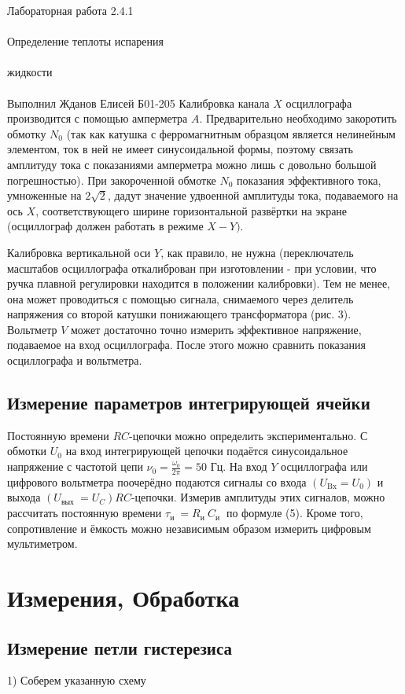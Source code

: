 \documentclass{astroedu-lab}
\begin{document}
\begin{problem}{\huge Лабораторная работа 2.4.1\\\\Определение теплоты испарения\\\\жидкости\\\\Выполнил Жданов Елисей Б01-205}
Калибровка канала $X$ осциллографа производится с помощью амперметра $A$. Предварительно необходимо закоротить обмотку $N_0$ (так как катушка с ферромагнитным образцом является нелинейным элементом, ток в ней не имеет синусоидальной формы, поэтому связать амплитуду тока с показаниями амперметра можно лишь с довольно большой погрешностью). При закороченной обмотке $N_0$ показания эффективного тока, умноженные на $2 \sqrt{2}$, дадут значение удвоенной амплитуды тока, подаваемого на ось $X$, соответствующего ширине горизонтальной развёртки на экране (осциллограф должен работать в режиме $X-Y)$.

Калибровка вертикальной оси $Y$, как правило, не нужна (переключатель масштабов осциллографа откалиброван при изготовлении - при условии, что ручка плавной регулировки находится в положении калибровки). Тем не менее, она может проводиться с помощью сигнала, снимаемого через делитель напряжения со второй катушки понижающего трансформатора (рис. 3). Вольтметр $V$ может достаточно точно измерить эффективное напряжение, подаваемое на вход осциллографа. После этого можно сравнить показания осциллографа и вольтметра.

\subsection{Измерение параметров интегрирующей ячейки}

Постоянную времени $R C$-цепочки можно определить экспериментально. С обмотки $U_0$ на вход интегрирующей цепочки подаётся синусоидальное напряжение с частотой цепи $\nu_0=\frac{\omega_0}{2 \pi}=50$ Гц. На вход $Y$ осциллографа или цифрового вольтметра поочерёдно подаются сигналы со входа $\left(U_{\mathrm{Bx}}=U_0\right)$ и выхода $\left(U_{\text {вых }}=U_C\right) R C$-цепочки. Измерив амплитуды этих сигналов, можно рассчитать постоянную времени $\tau_{\text {и }}=R_{\text {и }} C_{\text {и }}$ по формуле (5). Кроме того, сопротивление и ёмкость можно независимым образом измерить цифровым мультиметром.

\section{Измерения, Обработка}

\subsection{Измерение петли гистерезиса}

1) Соберем указанную схему


\end{problem}
\end{document}

